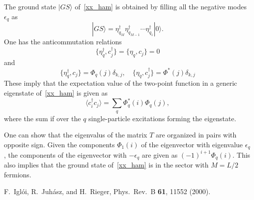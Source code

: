 \documentclass[twocolumn,superscriptaddress,prb,10pt]{revtex4-1}
\begin{document}
The ground state $|GS\rangle$ of~\eqref{xx_ham} is obtained by filling all the 
negative modes $\epsilon_q$ as 
%
\begin{equation}
|GS\rangle=\eta^\dagger_{q_M}\eta^\dagger_{q_{M-1}}\cdots\eta_{q_1}^\dagger|0\rangle.
\end{equation}
%
One has the anticommutation relations
%
\begin{equation}
\{\eta^\dagger_q,c^\dagger_j\}=\{\eta_q,c_j\}=0
\end{equation}
%
and
%
\begin{equation}
\{\eta_q^\dagger,c_j\}=\Phi_q(j)\delta_{k,j},\quad\{\eta_q,c^\dagger_j\}=\Phi^*(j)
\delta_{k,j}
\end{equation}
%
These imply that the expectation value of the two-point function in a generic 
eigenstate of~\eqref{xx_ham} is given as 
%
\begin{equation}
\langle c_i^\dagger c_j\rangle=\sum_{q}\Phi_q^*(i)\Phi_q(j), 
\end{equation}
%
where the sum if over the $q$ single-particle excitations forming the 
eigenstate. 

One can show that the eigenvalus of the matrix $T$ are organized in pairs with 
opposite sign. Given the components $\Phi_1(i)$ of the eigenvector with eigenvalue 
$\epsilon_q$, the components of the eigenvector with $-\epsilon_q$ are given 
as $(-1)^{i+1}\Phi_q(i)$. This also implies that the ground state of~\eqref{xx_ham} 
is in the sector with $M=L/2$ fermions. 






\begin{thebibliography}{99}


F.~Igl\'oi, R.~Juh\'asz, and H.~Rieger, Phys.\ Rev.\ B {\bf 61}, 11552 (2000).


\end{thebibliography}
\end{document}
